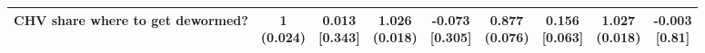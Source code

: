 {\begin{tabular}[t]{lcccccccc}
\hspace{1em}CHV share where to get dewormed? & \makecell[c]{1\\(0.024)} & \makecell[c]{0.013\\{[0.343]}} & \makecell[c]{1.026\\(0.018)} & \makecell[c]{-0.073\\{[0.305]}} & \makecell[c]{0.877\\(0.076)} & \makecell[c]{0.156\\{[0.063]}} & \makecell[c]{1.027\\(0.018)} & \makecell[c]{-0.003\\{[0.81]}}\\
\bottomrule
\end{tabular}}

